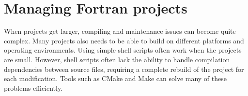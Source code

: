 \chapter{Managing Fortran projects}

When projects get larger, compiling and maintenance issues can become quite complex. Many projects also needs to be able to build on different platforms and operating environments. Using simple shell scripts often work when the projects are small. However, shell scripts often lack the ability to handle compilation dependencies between source files, requiring a complete rebuild of the project for each modification. Tools such as CMake and Make can solve many of these problems efficiently.

